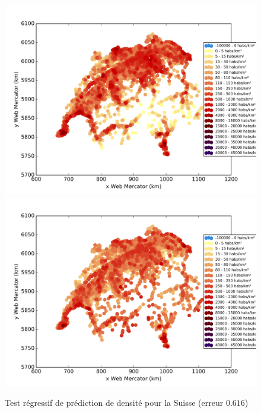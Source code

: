 \documentclass{book}
\begin{document}
\begin{figure}[H]
\begin{center}
\includegraphics[scale=0.5]{images/suisse_ground_truth.png}
\includegraphics[scale=0.5]{images/suisse_Random_Forest_Regression.png}
\end{center}
\caption{Test régressif de prédiction de densité pour la Suisse (erreur $0.616$)}
\label{test_suisse}
\end{figure}
\clearpage


\backmatter

\listoftables

\listoffigures



\end{document}
